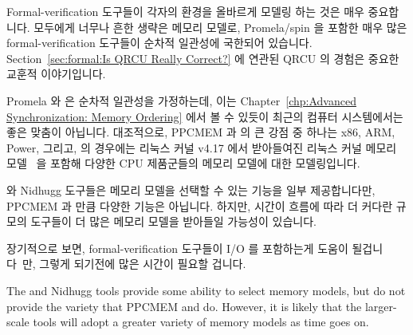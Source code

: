 Formal-verification 도구들이 각자의 환경을 올바르게 모델링 하는 것은 매우
중요합니다.
모두에게 너무나 흔한 생략은 메모리 모델로, Promela/spin 을 포함한 매우 많은
formal-verification 도구들이 순차적 일관성에 국한되어 있습니다.
Section~\ref{sec:formal:Is QRCU Really Correct?}
에 연관된 QRCU 의 경험은 중요한 교훈적 이야기입니다.

Promela 와  은 순차적 일관성을 가정하는데, 이는
Chapter~\ref{chp:Advanced Synchronization: Memory Ordering} 에서 볼 수 있듯이
최근의 컴퓨터 시스템에서는 좋은 맞춤이 아닙니다.
대조적으로, PPCMEM 과  의 큰 강점 중 하나는 x86, ARM, Power, 그리고,
 의 경우에는 리눅스 커널 v4.17 에서 받아들여진 리눅스 커널 메모리
모델~\cite{Alglave:2018:FSC:3173162.3177156} 을 포함해 다양한 CPU 제품군들의
메모리 모델에 대한 모델링입니다.
\iffalse

It is critically important that formal-verification tools correctly
model their environment.
One all-too-common omission is the memory model, where a great
many formal-verification tools, including Promela/spin, are
restricted to sequential consistency.
The QRCU experience related in
Section~\ref{sec:formal:Is QRCU Really Correct?}
is an important cautionary tale.

Promela and \co{spin} assume sequential consistency, which is not a
good match for modern computer systems, as was seen in
Chapter~\ref{chp:Advanced Synchronization: Memory Ordering}.
In contrast, one of the great strengths of PPCMEM and \co{herd}
is their detailed modeling of various CPU families memory models,
including x86, ARM, Power, and, in the case of \co{herd},
even a Linux-kernel memory model~\cite{Alglave:2018:FSC:3173162.3177156},
which has been accepted into version 4.17 of
the Linux kernel.
\fi

 와 Nidhugg 도구들은 메모리 모델을 선택할 수 있는 기능을 일부
제공합니다만, PPCMEM 과  만큼 다양한 기능은 아닙니다.
하지만, 시간이 흐름에 따라 더 커다란 규모의 도구들이 더 많은 메모리 모델을
받아들일 가능성이 있습니다.

장기적으로 보면, formal-verification 도구들이 I/O 를 포함하는게 도움이
될겁니다~\cite{PaulEMcKenney2016LinuxKernelMMIO}만, 그렇게 되기전에 많은 시간이
필요할 겁니다.
\iffalse

The  and Nidhugg tools provide some ability to select
memory models, but do not provide the variety that PPCMEM and
 do.
However, it is likely that the larger-scale tools will adopt
a greater variety of memory models as time goes on.

